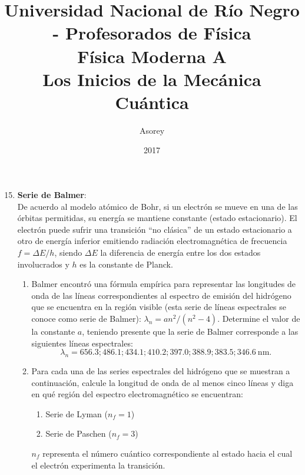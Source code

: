 \documentclass[a4paper,12pt]{article}
\begin{document}
\title{
{\normalsize{Universidad Nacional de Río Negro - Profesorados de Física}}\\
Física Moderna A \\ Los Inicios de la Mecánica Cuántica\\}
\author{Asorey}
\date{2017}
\maketitle

\begin{enumerate}
\setcounter{enumi}{14}      %

\item {\bf{Serie de Balmer}}:\\
	De acuerdo al modelo atómico de Bohr, si un electrón se mueve en una de las
		órbitas permitidas, su energía se mantiene constante (estado
		estacionario). El electrón puede sufrir una transición ``no clásica''
		de un estado estacionario a otro de energía inferior emitiendo
		radiación electromagnética de frecuencia $ f = \Delta E/h$, siendo
		$\Delta E$ la diferencia de energía entre los dos estados involucrados
		y $h$ es la constante de Planck.
	\begin{enumerate}
		\item Balmer encontró una fórmula empírica para representar las
			longitudes de onda de las líneas correspondientes al espectro de
			emisión del hidrógeno que se encuentra en la región visible (esta
			serie de líneas espectrales se conoce como serie de Balmer):
			$\lambda_n = a n^2 / (n^2 - 4)$. Determine el valor de la constante
			$a$, teniendo presente que la serie de Balmer corresponde a las
			siguientes líneas espectrales: $$\lambda_n=656.3; 486.1; 434.1;
			410.2; 397.0; 388.9; 383.5; 346.6\mathrm{\ nm.}$$
		\item Para cada una de las series espectrales del hidrógeno que se
			muestran a continuación, calcule la longitud de onda de al menos
			cinco líneas y diga en qué región del espectro electromagnético se
			encuentran:
			\begin{enumerate}
				\item Serie de Lyman ($n_f = 1$)
				\item Serie de Paschen ($n_f = 3$)
			\end{enumerate}
			$n_f$ representa el número cuántico correspondiente al estado hacia
			el cual el electrón experimenta la transición.
	\end{enumerate}


\end{enumerate}
\end{document}
